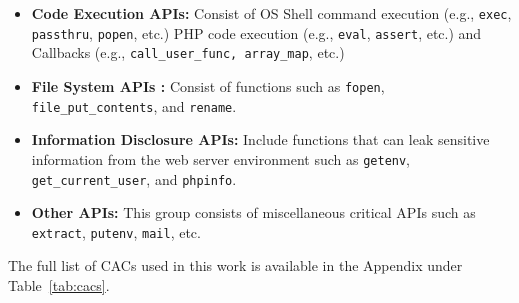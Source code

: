 \begin{itemize}
    \item \textbf{Code Execution APIs:} Consist of OS Shell command execution (e.g., \texttt{exec}, \texttt{passthru}, \texttt{popen}, etc.) PHP code execution (e.g., \texttt{eval}, \texttt{assert}, etc.) and Callbacks (e.g., \texttt{call\_user\_func, array\_map}, etc.)
    \item \textbf{File System APIs :} Consist of functions such as \texttt{fopen}, \texttt{file\_put\_contents}, and \texttt{rename}.
    \item \textbf{Information Disclosure APIs:} Include functions that can leak sensitive information from the web server environment such as \texttt{getenv}, \texttt{get\_current\_user}, and \texttt{phpinfo}.
    \item \textbf{Other APIs:} This group consists of miscellaneous critical APIs such as \texttt{extract}, \texttt{putenv}, \texttt{mail}, etc.
\end{itemize}

The full list of CACs used in this work is available in the Appendix under Table~\ref{tab:cacs}.
    



